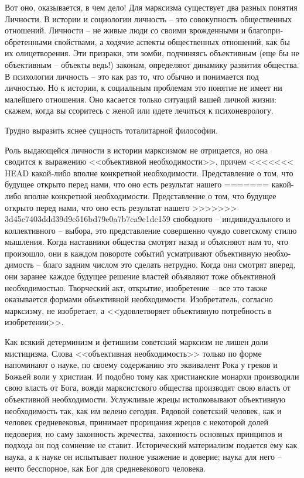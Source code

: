\documentclass{book}
\begin{document}
Вот оно, оказывается, в чем дело! Для марксизма сущест­вует два разных понятия Личности. В истории и социологии личность -- это 
совокупность общественных отношений. Лич­ности -- не живые люди со своими врожденными и благопри­обретенными свойствами, а ходячие 
аспекты общественных отношений, как бы их олицетворения. Эти призраки, эти зом­би, подчиняясь объективным (еще бы не объективным 
-- объек­ты ведь!) законам, определяют динамику развития общества. В психологии личность -- это как раз то, что обычно и 
понимает­ся под личностью. Но к истории, к социальным проблемам это понятие не имеет ни малейшего отношения. Оно касается только 
ситуаций вашей личной жизни: скажем, когда вы ссо­ритесь с женой или идете лечиться к психоневрологу.

Трудно выразить яснее сущность тоталитарной философии.

Роль выдающейся личности в истории марксизмом не отри­цается, но она сводится к выражению <<объективной необхо­димости>>, причем 
<<<<<<< HEAD
какой‑либо вполне конкретной необходи­мости. Представление о том, что будущее открыто перед нами, что оно есть результат нашего 
=======
какой-либо вполне конкретной необходи­мости. Представление о том, что будущее открыто перед нами, что оно есть результат нашего 
>>>>>>> 3d45c7403ddd39d9e516bd79e0a7b7ca9e1dc159
свободного -- индивидуального и коллективного -- выбора, это представление совершенно чуждо советскому стилю мышления. Когда 
наставники общества смотрят назад и объясняют нам то, что произошло, они в каждом повороте событий усматривают объективную 
необхо­димость -- благо задним числом это сделать нетрудно. Когда они смотрят вперед, они заранее каждое будущее решение властей 
объявляют тоже объективной необходимостью. Твор­ческий акт, открытие, изобретение -- все это также оказывается формами 
объективной необходимости. Изобретатель, согласно марксизму, не изобретает, а <<удовлетворяет объективную потребность в 
изобретении>>.

Как всякий детерминизм и фетишизм советский марксизм не лишен доли мистицизма. Слова <<объективная необходимость>> только по форме 
напоминают о науке, по своему содержанию это эквивалент Рока у греков и Божьей воли у христиан. И подобно тому как христианские 
монархи производили свою власть от Бога, вожди марксистского общества производят свою власть от объективной необходимости. 
Услужливые жрецы истолковывают объективную необходимость так, как им велено сегодня. Рядовой советский человек, как и человек 
средневековья, принимает прорицания жрецов с некоторой долей недоверия, но саму законность жречества, законность основных 
принципов и подхода он под сомнение не ставит. Исторический материализм подается ему как наука, а к науке он испытывает полное 
уважение и доверие; наука для него -- нечто бесспорное, как Бог для средневекового человека.
\end{document}
